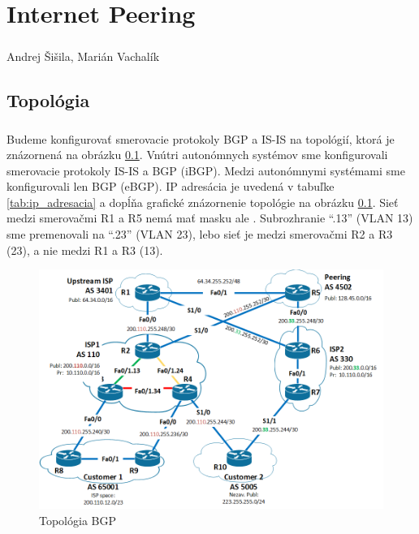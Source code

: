 \documentclass[12pt,twoside,a4paper]{report}
\begin{document}

\setcounter{chapter}{1}
\chapter*{Internet Peering}
\paragraph{}
Andrej Šišila, Marián Vachalík

\tableofcontents

\newpage
\section{Topológia}
\paragraph{}
Budeme konfigurovať smerovacie protokoly BGP a IS-IS na topológií, ktorá je znázornená na obrázku \ref{fig:bgp_isis_topo}. Vnútri autonómnych systémov sme konfigurovali smerovacie protokoly IS-IS a BGP (iBGP). Medzi autonómnymi systémami sme konfigurovali len BGP (eBGP). IP adresácia je uvedená v tabuľke \ref{tab:ip_adresacia} a dopĺňa grafické znázornenie topológie na obrázku \ref{fig:bgp_isis_topo}. Sieť medzi smerovačmi R1 a R5 nemá mať masku  ale . Subrozhranie “.13” (VLAN 13) sme premenovali na “.23” (VLAN 23), lebo sieť je medzi smerovačmi R2 a R3 (23), a nie medzi R1 a R3 (13).

\begin{figure}[!htbp]
\centering
\includegraphics[width=14cm,keepaspectratio]{bgp_isis_topo}
\caption{Topológia BGP}
\label{fig:bgp_isis_topo}
\end{figure}
\end{document}
